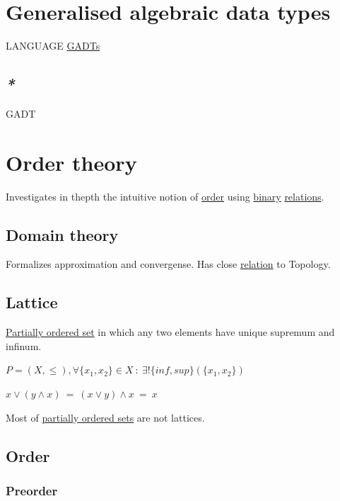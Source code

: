 \documentclass[a4paper,14pt,oneside]{book}
\begin{document}
\chapter{\label{org8ac10fc}Generalised algebraic data types}
\label{sec:org68252e8}

LANGUAGE \hyperref[org4671ec5]{GADTs}

\section{\emph{*}}
\label{sec:org42835b4}

\label{org2bc24fb}GADT

\chapter{\label{org2e7e5ae}Order theory}
\label{sec:org00f6285}

Investigates in thepth the intuitive notion of \hyperref[org91521a8]{order} using \hyperref[org60ae3a8]{binary} \hyperref[org5d1ca7a]{relations}.

\section{\label{orgce12c04}Domain theory}
\label{sec:org1e7c204}

Formalizes approximation and convergense.
Has close \hyperref[orgf3860df]{relation} to Topology.

\section{\label{orgdee92b7}Lattice}
\label{sec:orgcef5f0b}

\hyperref[org539b118]{Partially ordered set} in which any two elements have unique supremum and infinum.

\(P = (X, \le ), \forall \{x_{1}, x_{2}\} \in X \ : \ \exists! \{inf, sup\}(\{x_{1},x_{2}\})\)

\(x \lor (y \land x) \ = \ (x \lor y) \land x \ = \ x\)

Most of \hyperref[org67d3ead]{partially ordered sets} are not lattices.

\section{\label{org91521a8}Order}
\label{sec:org19166c2}

\subsection{\label{orgd96f12a}Preorder}
\label{sec:orgde2d8a1}
\end{document}
